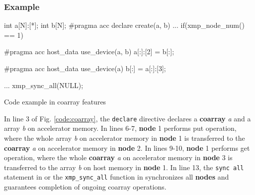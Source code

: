 \subsubsection*{Example}
\begin{myfigure}
\begin{minipage}{0.45\hsize}
\begin{center}
\end{center}
\end{minipage}
%
\begin{minipage}{0.53\hsize}
\begin{center}
\begin{XACCCexampleR}
int a[N]:[*];
int b[N];
#pragma acc declare create(a, b)
...
if(xmp_node_num() == 1){
#pragma acc host_data use_device(a, b)
  a[:]:[2] = b[:];

#pragma acc host_data use_device(a)
  b[:] = a[:]:[3];
}
...
xmp_sync_all(NULL);
\end{XACCCexampleR}
\end{center}
\end{minipage}
\caption{Code example in coarray features}\label{code:coarray}
\end{myfigure}

In line 3 of Fig. \ref{code:coarray},
the {\tt declare} directive declares a {\bf coarray} {\it a} and a array {\it b} on accelerator memory.
In lines 6-7,
{\bf node} 1 performs put operation, where
the whole array {\it b} on accelerator memory in {\bf node} 1 is transferred to the {\bf coarray} {\it a} on accelerator memory in {\bf node} 2.
In lines 9-10,
{\bf node} 1 performs get operation, where
the whole {\bf coarray} {\it a} on accelerator memory in {\bf node} 3 is transferred to the array {\it b} on host memory in {\bf node} 1.
In line 13,
the {\tt sync all} statement in {\XACCF} or the {\tt xmp\_sync\_all} function in {\XACCC} synchronizes all {\bf nodes} and guarantees completion of ongoing coarray operations.

